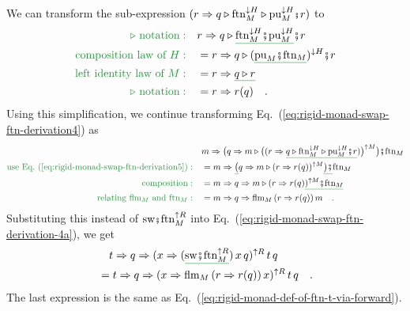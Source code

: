 We can transform the sub-expression $(r\Rightarrow q\triangleright\text{ftn}_{M}^{\downarrow H}\triangleright\text{pu}_{M}^{\downarrow H}\bef r)$
to
\begin{align}
{\color{greenunder}\triangleright\text{ notation}:}\quad & r\Rightarrow q\triangleright\gunderline{\text{ftn}_{M}^{\downarrow H}\bef\text{pu}_{M}^{\downarrow H}}\bef r\nonumber \\
{\color{greenunder}\text{composition law of }H:}\quad & =r\Rightarrow q\triangleright(\gunderline{\text{pu}_{M}\bef\text{ftn}_{M}})^{\downarrow H}\bef r\nonumber \\
{\color{greenunder}\text{left identity law of }M:}\quad & =r\Rightarrow\gunderline{q\triangleright r}\nonumber \\
{\color{greenunder}\triangleright\text{ notation}:}\quad & =r\Rightarrow r(q)\quad.\label{eq:rigid-monad-swap-ftn-derivation5}
\end{align}
Using this simplification, we continue transforming Eq.~(\ref{eq:rigid-monad-swap-ftn-derivation4})
as
\begin{align*}
 & m\Rightarrow\big(q\Rightarrow m\triangleright\big((r\Rightarrow\gunderline{q\triangleright\text{ftn}_{M}^{\downarrow H}\triangleright\text{pu}_{M}^{\downarrow H}\bef r})\big)^{\uparrow M}\big)\bef\text{ftn}_{M}\\
{\color{greenunder}\text{use Eq.~(\ref{eq:rigid-monad-swap-ftn-derivation5})}:}\quad & =m\Rightarrow\gunderline{\big(}q\Rightarrow m\triangleright(r\Rightarrow r(q))^{\uparrow M}\gunderline{\big)\bef}\text{ftn}_{M}\\
{\color{greenunder}\text{composition}:}\quad & =m\Rightarrow q\Rightarrow m\triangleright(r\Rightarrow r(q)\gunderline{)^{\uparrow M}\bef\text{ftn}_{M}}\\
{\color{greenunder}\text{relating }\text{flm}_{M}\text{ and }\text{ftn}_{M}:}\quad & =m\Rightarrow q\Rightarrow\text{flm}_{M}\left(r\Rightarrow r(q)\right)m\quad.
\end{align*}
Substituting this instead of $\text{sw}\bef\text{ftn}_{M}^{\uparrow R}$
into Eq.~(\ref{eq:rigid-monad-swap-ftn-derivation-4a}), we get
\begin{align*}
 & \quad t\Rightarrow q\Rightarrow(x\Rightarrow(\gunderline{\text{sw}\bef\text{ftn}_{M}^{\uparrow R}})\,x\,q)^{\uparrow R}\,t\,q\\
 & =t\Rightarrow q\Rightarrow(x\Rightarrow\text{flm}_{M}\left(r\Rightarrow r(q)\right)x)^{\uparrow R}\,t\,q\quad.
\end{align*}
The last expression is the same as Eq.~(\ref{eq:rigid-monad-def-of-ftn-t-via-forward}).

